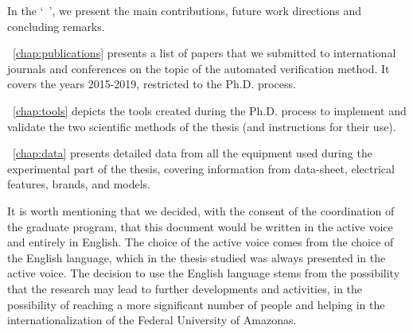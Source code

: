 In the `~', we present the main contributions, future work directions and concluding remarks.

~\autoref{chap:publications} presents a list of papers that we submitted to international journals and conferences on the topic of the automated verification method. It covers the years 2015-2019, restricted to the Ph.D. process.

~\autoref{chap:tools} depicts the tools created during the Ph.D. process to implement and validate the two scientific methods of the thesis (and instructions for their use).

~\autoref{chap:data} presents detailed data from all the equipment used during the experimental part of the thesis, covering information from data-sheet, electrical features, brands, and models. 

It is worth mentioning that we decided, with the consent of the coordination of the graduate program, that this document would be written in the active voice and entirely in English. The choice of the active voice comes from the choice of the English language, which in the thesis studied was always presented in the active voice. The decision to use the English language stems from the possibility that the research may lead to further developments and activities, in the possibility of reaching a more significant number of people and helping in the internationalization of the Federal University of Amazonas.
